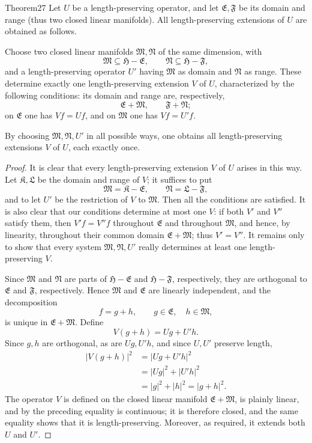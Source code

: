 ﻿\documentclass[paper=b5,fontsize=13pt,bookmarkpackage=false,twoside]{scrartcl}
\begin{document}
\begin{namedstatement}{Theorem}{27}\label{thm:27}
Let $U$ be a length-preserving operator, and let $\mathfrak E,\mathfrak F$ be its domain and range (thus two closed linear manifolds). All length-preserving extensions of $U$ are obtained as follows.

Choose two closed linear manifolds $\mathfrak M,\mathfrak N$ of the same dimension, with
\[
\mathfrak M\subseteq\mathfrak H-\mathfrak E,\qquad
\mathfrak N\subseteq\mathfrak H-\mathfrak F,
\]
and a length-preserving operator $U'$ having $\mathfrak M$ as domain and $\mathfrak N$ as range. These determine exactly one length-preserving extension $V$ of $U$, characterized by the following conditions: its domain and range are, respectively,
\[
\mathfrak E+\mathfrak M,\qquad
\mathfrak F+\mathfrak N;
\]
on $\mathfrak E$ one has $Vf=Uf$, and on $\mathfrak M$ one has $Vf=U'f$.

By choosing $\mathfrak M,\mathfrak N,U'$ in all possible ways, one obtains all length-preserving extensions $V$ of $U$, each exactly once.
\end{namedstatement}

\begin{proof}
It is clear that every length-preserving extension $V$ of $U$ arises in this way. Let $\mathfrak K,\mathfrak L$ be the domain and range of $V$; it suffices to put
\[
\mathfrak M=\mathfrak K-\mathfrak E,\qquad
\mathfrak N=\mathfrak L-\mathfrak F,
\]
and to let $U'$ be the restriction of $V$ to $\mathfrak M$. Then all the conditions are satisfied. It is also clear that our conditions determine at most one $V$: if both $V'$ and $V''$ satisfy them, then $V'f=V''f$ throughout $\mathfrak E$ and throughout $\mathfrak M$, and hence, by linearity, throughout their common domain $\mathfrak E+\mathfrak M$; thus $V'=V''$. It remains only to show that every system $\mathfrak M,\mathfrak N,U'$ really determines at least one length-preserving $V$.

Since $\mathfrak M$ and $\mathfrak N$ are parts of $\mathfrak H-\mathfrak E$ and $\mathfrak H-\mathfrak F$, respectively, they are orthogonal to $\mathfrak E$ and $\mathfrak F$, respectively. Hence $\mathfrak M$ and $\mathfrak E$ are linearly independent, and the decomposition
\[
f=g+h,\qquad g\in\mathfrak E,\quad h\in\mathfrak M,
\]
is unique in $\mathfrak E+\mathfrak M$. Define
\[
V(g+h)=Ug+U'h.
\]
Since $g,h$ are orthogonal, as are $Ug,U'h$, and since $U,U'$ preserve length,
\begin{align*}
|V(g+h)|^2
 &=|Ug+U'h|^2\\
 &=|Ug|^2+|U'h|^2\\
 &=|g|^2+|h|^2=|g+h|^2.
\end{align*}
The operator $V$ is defined on the closed linear manifold $\mathfrak E+\mathfrak M$, is plainly linear, and by the preceding equality is continuous; it is therefore closed, and the same equality shows that it is length-preserving. Moreover, as required, it extends both $U$ and $U'$.
\end{proof}
\end{document}
